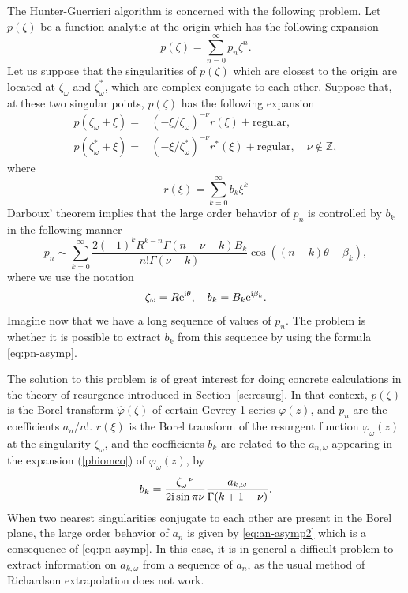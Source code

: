 \documentclass[a4paper,11pt]{article}
\theoremstyle{definition}
\def\IZ{{\mathbb Z}}
\newcommand{\re}{{\rm e}}
\newcommand{\ri}{{\rm i}}
\newcommand{\wh}[1]{\widehat{#1}}
\begin{document}
The Hunter-Guerrieri algorithm \cite{HunterGuerrieri1980} is concerned
with the following problem.
Let $p(\zeta)$ be a function analytic at the origin which has the
following expansion 
%
\begin{equation}
  p(\zeta) = \sum_{n=0}^\infty p_n \zeta^n.
\end{equation}
%
Let us suppose that the singularities of $p(\zeta)$ which are closest to the origin are 
located at $\zeta_\omega$ and $\zeta_\omega^*$, which are complex conjugate to each other.
Suppose that, at these two singular points, $p(\zeta)$ has the following
expansion
\begin{subequations}
\begin{align}
  p(\zeta_\omega+\xi) =
  &(-\xi/\zeta_\omega)^{-\nu} r(\xi) +\text{regular},
    \label{eq:pr}\\
  p(\zeta_\omega^*+\xi) =
  &(-\xi/\zeta_\omega^*)^{-\nu} r^*(\xi)  +\text{regular},\quad
    \nu\not\in\IZ,
\end{align}
\end{subequations}
where
\begin{equation}
  r(\xi) = \sum_{k=0}^\infty b_k\xi^k
\end{equation}
Darboux' theorem \cite{darboux1878memoire,henrici} implies that the
large order behavior of $p_n$ is controlled by $b_k$ in the following
manner
\begin{equation}
  p_n \sim \sum_{k=0}^\infty \frac{2(-1)^kR^{k-n}\Gamma(n+\nu-k)B_k}
  {n!\Gamma(\nu-k)}\cos((n-k)\theta-\beta_k),
  \label{eq:pn-asymp}
\end{equation}
where we use the notation
\begin{equation}
  \zeta_\omega = R \re^{\ri \theta},\quad b_k = B_k \re^{\ri\beta_k}.
\end{equation}
Imagine now that we have a long sequence of values of $p_n$. The problem is whether it is
possible to extract $b_k$ from this sequence by using the formula
\eqref{eq:pn-asymp}.

The solution to this problem is of great interest for doing concrete calculations
in the theory of resurgence introduced in Section~\ref{sc:resurg}. In
that context, $p(\zeta)$ is the Borel transform
$\wh{\varphi}(\zeta)$ of certain Gevrey-1 series $\varphi(z)$, and
$p_n$ are the coefficients $a_n/n!$.  $r(\xi)$ is the Borel transform
of the resurgent function $\varphi_\omega(z)$ at the singularity $\zeta_\omega$,
and the coefficients $b_k$ are related to the $a_{n, \omega}$ appearing in the expansion (\ref{phiomco}) of
$\varphi_\omega(z)$, by
%
\begin{equation}
  b_k = \frac{\zeta_\omega^{-\nu}}{2\ri\sin\pi\nu} \frac{a_{k, \omega}}{\Gamma(k+1-\nu)}.
\end{equation}
%
When two nearest singularities conjugate to each other are present in
the Borel plane, the large order behavior of $a_n$ is given by
\eqref{eq:an-asymp2} which is a consequence of \eqref{eq:pn-asymp}.
In this case, it is in general a
difficult problem to extract information on $a_{k, \omega }$ from a sequence
of $a_n$, as the usual method of Richardson extrapolation does not work. 
\end{document}
